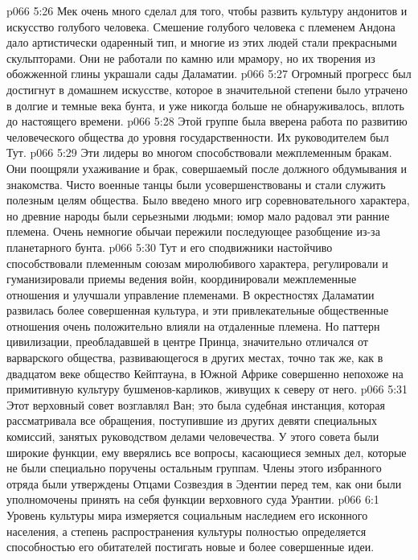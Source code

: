 \vs p066 5:26 Мек очень много сделал для того, чтобы развить культуру андонитов и искусство голубого человека. Смешение голубого человека с племенем Андона дало артистически одаренный тип, и многие из этих людей стали прекрасными скульпторами. Они не работали по камню или мрамору, но их творения из обожженной глины украшали сады Даламатии.
\vs p066 5:27 Огромный прогресс был достигнут в домашнем искусстве, которое в значительной степени было утрачено в долгие и темные века бунта, и уже никогда больше не обнаруживалось, вплоть до настоящего времени.
\vs p066 5:28 \pc {}\bibnobreakspace {} Этой группе была вверена работа по развитию человеческого общества до уровня государственности. Их руководителем был Тут.
\vs p066 5:29 Эти лидеры во многом способствовали межплеменным бракам. Они поощряли ухаживание и брак, совершаемый после должного обдумывания и знакомства. Чисто военные танцы были усовершенствованы и стали служить полезным целям общества. Было введено много игр соревновательного характера, но древние народы были серьезными людьми; юмор мало радовал эти ранние племена. Очень немногие обычаи пережили последующее разобщение из\hyp{}за планетарного бунта.
\vs p066 5:30 Тут и его сподвижники настойчиво способствовали племенным союзам миролюбивого характера, регулировали и гуманизировали приемы ведения войн, координировали межплеменные отношения и улучшали управление племенами. В окрестностях Даламатии развилась более совершенная культура, и эти привлекательные общественные отношения очень положительно влияли на отдаленные племена. Но паттерн цивилизации, преобладавшей в центре Принца, значительно отличался от варварского общества, развивающегося в других местах, точно так же, как в двадцатом веке общество Кейптауна, в Южной Африке совершенно непохоже на примитивную культуру бушменов\hyp{}карликов, живущих к северу от него.
\vs p066 5:31 \pc {}\bibnobreakspace {} Этот верховный совет возглавлял Ван; это была судебная инстанция, которая рассматривала все обращения, поступившие из других девяти специальных комиссий, занятых руководством делами человечества. У этого совета были широкие функции, ему вверялись все вопросы, касающиеся земных дел, которые не были специально поручены остальным группам. Члены этого избранного отряда были утверждены Отцами Созвездия в Эдентии перед тем, как они были уполномочены принять на себя функции верховного суда Урантии.
\vs p066 6:1 Уровень культуры мира измеряется социальным наследием его исконного населения, а степень распространения культуры полностью определяется способностью его обитателей постигать новые и более совершенные идеи.
